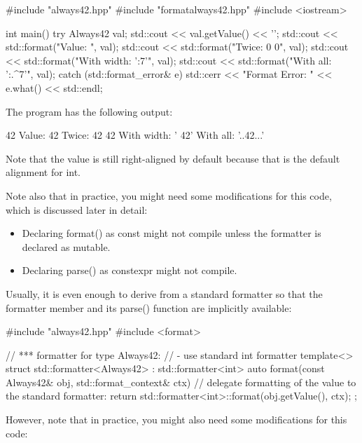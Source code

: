 \begin{cpp}
#include "always42.hpp"
#include "formatalways42.hpp"
#include <iostream>

int main()
{
	try {
		Always42 val;
		std::cout << val.getValue() << '\n';
		std::cout << std::format("Value: {}\n", val);
		std::cout << std::format("Twice: {0} {0}\n", val);
		std::cout << std::format("With width: '{:7}'\n", val);
		std::cout << std::format("With all: '{:.^7}'\n", val);
	}
	catch (std::format_error& e) {
		std::cerr << "Format Error: " << e.what() << std::endl;
	}
}
\end{cpp}

The program has the following output:

\begin{shell}
42
Value: 42
Twice: 42 42
With width: ’     42’
With all:   ’..42...’
\end{shell}

Note that the value is still right-aligned by default because that is the default alignment for int.

Note also that in practice, you might need some modifications for this code, which is discussed later in detail:

\begin{itemize}
\item
Declaring format() as const might not compile unless the formatter is declared as mutable.

\item
Declaring parse() as constexpr might not compile.
\end{itemize}


Usually, it is even enough to derive from a standard formatter so that the formatter member and its parse() function are implicitly available:


\begin{cpp}
#include "always42.hpp"
#include <format>

// *** formatter for type Always42:
// - use standard int formatter
template<>
struct std::formatter<Always42> : std::formatter<int>
{
	auto format(const Always42& obj, std::format_context& ctx) {
		// delegate formatting of the value to the standard formatter:
		return std::formatter<int>::format(obj.getValue(), ctx);
	}
};
\end{cpp}

However, note that in practice, you might also need some modifications for this code:

